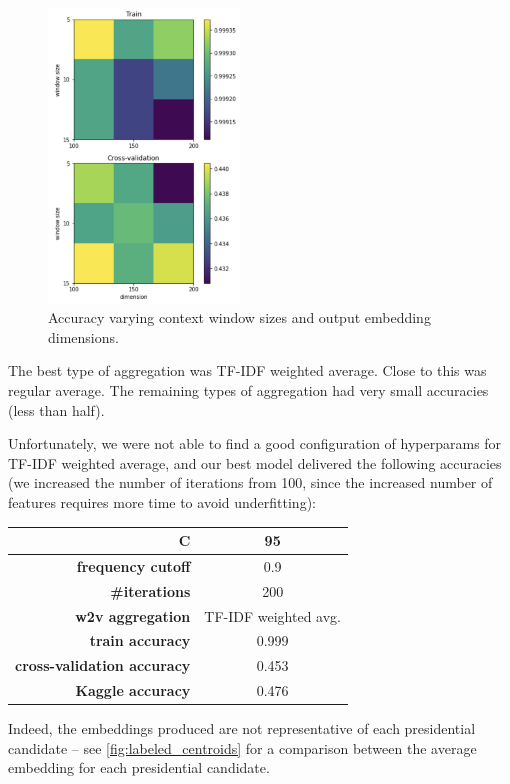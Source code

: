 \documentclass[11pt]{article}
\begin{document}
\begin{figure}
\centering
  \includegraphics[width=2in]{figures/embeddings_windows_dims.png}
  \caption{Accuracy varying context window sizes and output embedding dimensions.}
  \label{fig:acc_embeddings}
\end{figure}

The best type of aggregation was TF-IDF weighted average. Close to this was regular average. The remaining types of aggregation had very small accuracies (less than half).

Unfortunately, we were not able to find a good configuration of hyperparams for TF-IDF weighted average, and our best model delivered the following accuracies (we increased the number of iterations from 100, since the increased number of features requires more time to avoid underfitting):

\begin{center}
\begin{tabular}{r|c}
  $\mathbf{C}$ & 95 \\\hline 
  \textbf{frequency cutoff} & 0.9 \\\hline
  \textbf{\#iterations} & 200 \\\hline
  \textbf{w2v aggregation} & TF-IDF weighted avg. \\\hline 
  \textbf{train accuracy} & 0.999 \\\hline
  \textbf{cross-validation accuracy} & 0.453 \\\hline
  \textbf{Kaggle accuracy}  & 0.476
\end{tabular}
\end{center}

Indeed, the embeddings produced are not representative of each presidential candidate -- see \cref{fig:labeled_centroids} for a comparison between the average embedding for each presidential candidate.
\end{document}
